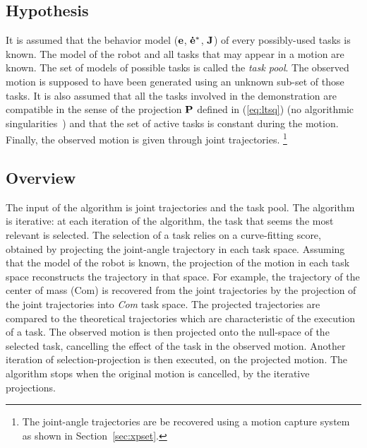 \documentclass[journal]{IEEEtran}
\begin{document}
\subsection{Hypothesis}
It is assumed that the behavior model (${\mathbf{e}}$, ${\mathbf{\dot{e}^*}}$, ${\mathbf{J}}$) of every
possibly-used tasks is known. The model of the robot and all tasks that may appear in a 
motion are known. The set of models of possible tasks is called the \emph{task pool}.
The observed motion is supposed to have been generated using an unknown sub-set of those tasks.  
It is also assumed that all the tasks involved in the demonstration are compatible
in the sense of the projection ${\mathbf{P}}$ defined in (\ref{eq:ltsq})
(no algorithmic singularities~\cite{chiaverini97}) and that the set
of active tasks is constant during the motion.
Finally, the observed motion is given through
joint trajectories. \footnote{The joint-angle trajectories are be recovered using a motion
capture system as shown in Section~\ref{sec:xpset}.}

\subsection{Overview}
\label{sec:alg1:selec}
The input of the algorithm is joint trajectories and
the task pool. The algorithm is iterative: at each iteration of the algorithm, the task that seems the
most relevant is selected. The selection of a task relies
on a curve-fitting score, obtained by projecting the joint-angle trajectory in each task space.
Assuming that the model of the robot is known,
the projection of the motion in each task space reconstructs the trajectory in that space.
For example, the trajectory of the center of mass (Com) is recovered from the joint trajectories by the projection
of the joint trajectories into \emph{Com} task space. 
The projected trajectories are
compared to the theoretical trajectories which are characteristic
of the execution of a task.
The observed motion is then projected
onto the null-space of the selected task, cancelling the effect of the task in the observed motion.
Another iteration of selection-projection is then executed, on the projected motion.
The algorithm stops when the original motion is cancelled, by the iterative projections.
\newcommand{\shOUTPUT}{\textbf{Output: }}
\newcommand{\shINPUT}{\textbf{Input: }}
\end{document}
